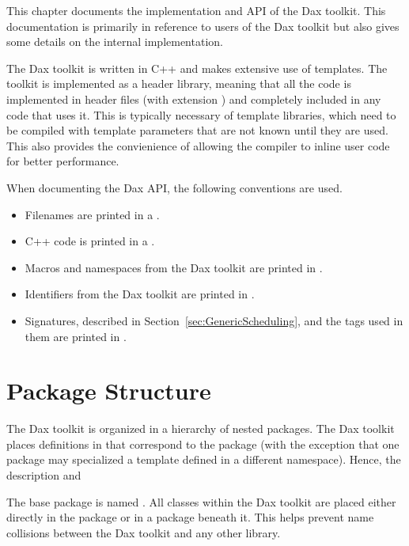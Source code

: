 
This chapter documents the implementation and API of the Dax toolkit. This
documentation is primarily in reference to users of the Dax toolkit but
also gives some details on the internal implementation.

The Dax toolkit is written in C++ and makes extensive use of templates. The
toolkit is implemented as a header library, meaning that all the code is
implemented in header files (with extension ) and
completely included in any code that uses it. This is typically necessary
of template libraries, which need to be compiled with template parameters
that are not known until they are used. This also provides the convienience
of allowing the compiler to inline user code for better performance.

When documenting the Dax API, the following conventions are used.
\begin{itemize}
\item Filenames are printed in a .
\item C++ code is printed in a .
\item Macros and namespaces from the Dax toolkit are printed
  in .
\item Identifiers from the Dax toolkit are printed in
  .
\item Signatures, described in Section~\ref{sec:GenericScheduling}, and the
  tags used in them are printed in .
\end{itemize}

\section{Package Structure}
\label{sec:PackageStructure}


The Dax toolkit is organized in a hierarchy of nested packages. The Dax
toolkit places definitions in   that
correspond to the package (with the exception that one package may
specialized a template defined in a different namespace). Hence, the
description and

The base package is named \dax{}. All classes within the Dax toolkit are
placed either directly in the \dax{} package or in a package beneath
it. This helps prevent name collisions between the Dax toolkit and any
other library.

